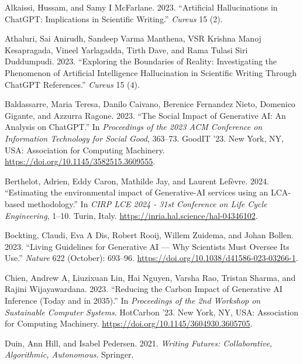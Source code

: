 \documentclass[
  letterpaper,
  DIV=11,
  numbers=noendperiod]{scrreprt}
\newlength{\cslhangindent}
\newenvironment{CSLReferences}[2] %
 {\begin{list}{}{%
  \setlength{\itemindent}{0pt}
  \setlength{\leftmargin}{0pt}
  \setlength{\parsep}{0pt}
  \ifodd #1
   \setlength{\leftmargin}{\cslhangindent}
   \setlength{\itemindent}{-1\cslhangindent}
  \fi
  \setlength{\itemsep}{#2\baselineskip}}}
 {\end{list}}
\begin{document}
\label{refs}
\begin{CSLReferences}{1}{0}
Alkaissi, Hussam, and Samy I McFarlane. 2023. {``Artificial
Hallucinations in ChatGPT: Implications in Scientific Writing.''}
\emph{Cureus} 15 (2).

Athaluri, Sai Anirudh, Sandeep Varma Manthena, VSR Krishna Manoj
Kesapragada, Vineel Yarlagadda, Tirth Dave, and Rama Tulasi Siri
Duddumpudi. 2023. {``Exploring the Boundaries of Reality: Investigating
the Phenomenon of Artificial Intelligence Hallucination in Scientific
Writing Through ChatGPT References.''} \emph{Cureus} 15 (4).

Baldassarre, Maria Teresa, Danilo Caivano, Berenice Fernandez Nieto,
Domenico Gigante, and Azzurra Ragone. 2023. {``The Social Impact of
Generative AI: An Analysis on ChatGPT.''} In \emph{Proceedings of the
2023 ACM Conference on Information Technology for Social Good}, 363--73.
GoodIT '23. New York, NY, USA: Association for Computing Machinery.
\url{https://doi.org/10.1145/3582515.3609555}.

Berthelot, Adrien, Eddy Caron, Mathilde Jay, and Laurent Lefèvre. 2024.
{``{Estimating the environmental impact of Generative-AI services using
an LCA-based methodology}.''} In \emph{{CIRP LCE 2024 - 31st Conference
on Life Cycle Engineering}}, 1--10. Turin, Italy.
\url{https://inria.hal.science/hal-04346102}.

Bockting, Claudi, Eva A Dis, Robert Rooij, Willem Zuidema, and Johan
Bollen. 2023. {``Living Guidelines for Generative AI --- Why Scientists
Must Oversee Its Use.''} \emph{Nature} 622 (October): 693--96.
\url{https://doi.org/10.1038/d41586-023-03266-1}.

Chien, Andrew A, Liuzixuan Lin, Hai Nguyen, Varsha Rao, Tristan Sharma,
and Rajini Wijayawardana. 2023. {``Reducing the Carbon Impact of
Generative AI Inference (Today and in 2035).''} In \emph{Proceedings of
the 2nd Workshop on Sustainable Computer Systems}. HotCarbon '23. New
York, NY, USA: Association for Computing Machinery.
\url{https://doi.org/10.1145/3604930.3605705}.

Duin, Ann Hill, and Isabel Pedersen. 2021. \emph{Writing Futures:
Collaborative, Algorithmic, Autonomous}. Springer.


\end{CSLReferences}
\end{document}
